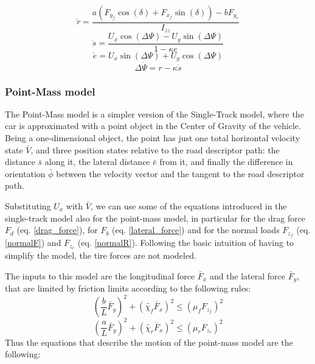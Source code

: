 \documentclass[a4paper, onecolumn, 12pt]{article}
\begin{document}
\begin{equation}
    \dot{r} = \frac{a(F_{y_f}\cos(\delta)+F_{x_f}\sin(\delta))-bF_{y_r}}{I_{zz}}
\end{equation}
\begin{equation}
    \dot{s} = \frac{U_x\cos(\Delta \varPsi) -U_y\sin(\Delta \varPsi)}{1-\kappa e}
\end{equation}
\begin{equation}
    \dot{e} = U_x\sin(\Delta \varPsi)+U_y \cos(\Delta \varPsi)
\end{equation}
\begin{equation}
    \Delta \dot{\varPsi} = r-\kappa \dot{s}
\end{equation}




\subsubsection{Point-Mass model}
The Point-Mass model is a simpler version of the Single-Track model, where the car is approximated with a point object
in the Center of Gravity of the vehicle. Being a one-dimensional object, the point has just one total horizontal velocity state $\bar{V}$, 
and three position states relative to the road descriptor path: the distance $\bar{s}$ along it, the lateral distance $\bar{e}$ from it, and finally the
difference in orientation $\bar{\phi}$ between the velocity vector and the tangent to the road descriptor path.

Substituting ${U}_x$ with $\bar{V}$, we can use some of the equations introduced in the single-track model also for the point-mass model,
in particular for the drag force ${F}_d$ (eq. \ref{drag_force}), for ${F}_b$ (eq. \ref{lateral_force}) and for the normal loads ${F}_{z_f}$ (eq. \ref{normalF}) and ${F}_{z_r}$ (eq. \ref{normalR}).
Following the basic intuition of having to simplify the model, the tire forces are not modeled.

The inputs to this model are the longitudinal force $\bar{F}_x$ and the lateral force $\bar{F}_y$, that are limited by friction limits
according to the following rules:
\begin{equation}
    \left(\frac{b}{L}\bar{F}_y\right)^2 + \left(\tilde{\chi_f}\bar{F}_x\right)^2 \leq \left(\mu_f F_{z_f}\right)^2
\end{equation}
\begin{equation}
    \left(\frac{a}{L}\bar{F}_y\right)^2 + \left(\tilde{\chi_r}\bar{F}_x\right)^2 \leq \left(\mu_r F_{z_r}\right)^2
\end{equation}
Thus the equations that describe the motion of the point-mass model are the following:
\end{document}

